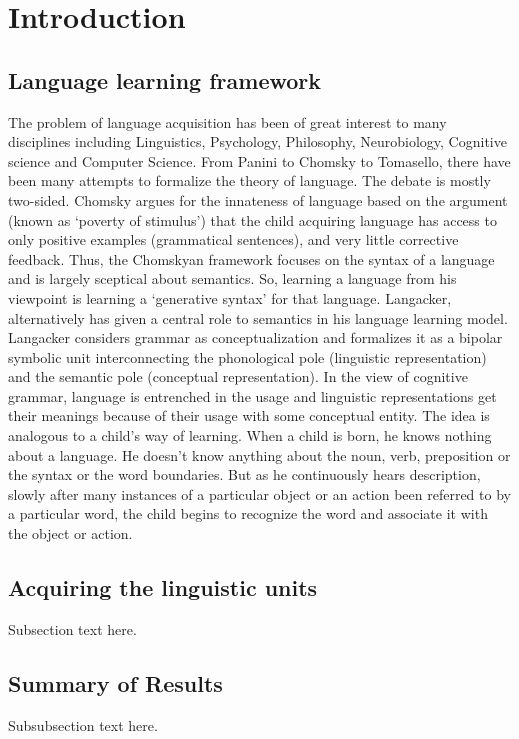 \documentclass[12pt, a4paper]{report}
\begin{document}
\chapter{Introduction}
\section{Language learning framework}
The problem of language acquisition has been of great interest to many disciplines including Linguistics, Psychology, Philosophy, Neurobiology, Cognitive science and Computer Science. From Panini\cite{} to Chomsky\cite{} to Tomasello, there have been many attempts to formalize the theory of language. The debate is mostly two-sided. Chomsky\cite{} argues for the innateness of language based on the argument (known as `poverty of stimulus') that the child acquiring language has access to only positive examples (grammatical sentences), and very little corrective feedback. Thus, the Chomskyan framework focuses on the syntax of a language and is largely sceptical about semantics. So, learning a language from his viewpoint is learning a `generative syntax' for that language. Langacker\cite{}, alternatively has given a central role to semantics in his language learning model. Langacker\cite{} considers grammar as conceptualization and formalizes it as a bipolar symbolic unit interconnecting the phonological pole (linguistic representation) and the semantic pole (conceptual representation). In the view of cognitive grammar, language is entrenched in the usage and linguistic representations get their meanings because of their usage with some conceptual entity.
The idea is analogous to a child’s way of learning. When a child is born, he knows nothing about a language. He doesn’t know anything about the noun, verb, preposition or the syntax or the word boundaries. But as he continuously hears description, slowly after many instances of a particular object or an action been referred to by a particular word, the child begins to recognize the word and associate it with the object or action. 

\section{Acquiring the linguistic units}
Subsection text here.


\section{Summary of Results}
Subsubsection text here.
\end{document}
